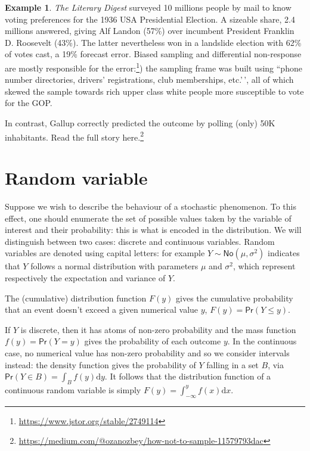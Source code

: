 \documentclass[
  11pt,
  letterpaper,
]{book}
\renewcommand{\href}[2]{#2\footnote{\url{#1}}}
\theoremstyle{definition}
\theoremstyle{definition}
\newtheorem{example}{Example}[chapter]
\theoremstyle{definition}
\theoremstyle{remark}
\begin{document}
\begin{example}
\protect\hypertarget{exm:Galluppoll}{}{\label{exm:Galluppoll} }
\emph{The Literary Digest} surveyed 10 millions people by mail to know voting preferences for the 1936 USA Presidential Election. A sizeable share, 2.4 millions answered, giving Alf Landon (57\%) over incumbent President Franklin D. Roosevelt (43\%). The latter nevertheless won in a landslide election with 62\% of votes cast, a 19\% forecast error. \href{https://www.jstor.org/stable/2749114}{Biased sampling and differential non-response are mostly responsible for the error:}) the sampling frame was built using ``phone number directories, drivers' registrations, club memberships, etc.'\,', all of which skewed the sample towards rich upper class white people more susceptible to vote for the GOP.

In contrast, Gallup correctly predicted the outcome by polling (only) 50K inhabitants. \href{https://medium.com/@ozanozbey/how-not-to-sample-11579793dac}{Read the full story here.}
\end{example}

\hypertarget{random-variable}{%
\section{Random variable}\label{random-variable}}

Suppose we wish to describe the behaviour of a stochastic phenomenon. To this effect, one should enumerate the set of possible values taken by the variable of interest and their probability: this is what is encoded in the distribution. We will distinguish between two cases: discrete and continuous variables. Random variables are denoted using capital letters: for example \(Y \sim \mathsf{No}(\mu, \sigma^2)\) indicates that \(Y\) follows a normal distribution with parameters \(\mu\) and \(\sigma^2\), which represent respectively the expectation and variance of \(Y\).

The (cumulative) distribution function \(F(y)\) gives the cumulative probability that an event doesn't exceed a given numerical value \(y\), \(F(y) = \mathsf{Pr}(Y \leq y)\).

If \(Y\) is discrete, then it has atoms of non-zero probability and the mass function \(f(y)=\mathsf{Pr}(Y=y)\) gives the probability of each outcome \(y\). In the continuous case, no numerical value has non-zero probability and so we consider intervals instead: the density function gives the probability of \(Y\) falling in a set \(B\), via \(\mathsf{Pr}(Y \in B) = \int_B f(y) \mathrm{d} y\). It follows that the distribution function of a continuous random variable is simply \(F(y) = \int_{-\infty}^y f(x) \mathrm{d} x\).
\end{document}
